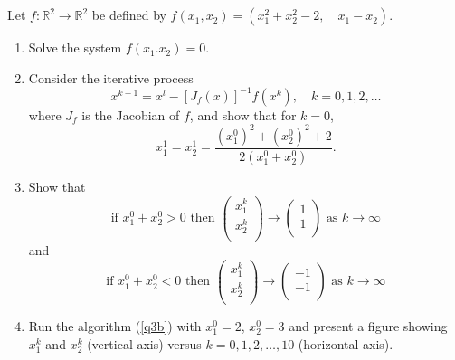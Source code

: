 \documentclass{article}
\begin{document}
\section{}
Let $f:\mathbb{R}^2 \to \mathbb{R}^2$ be defined by $f(x_1,x_2)= (x_1^2 + x_2^2-2, \quad x_1 - x_2)$.
\begin{enumerate}[label = (\alph*)]
    \item Solve the system $f(x_1.x_2)=0$.
    \item Consider the iterative process
    \begin{equation}
        \label{q3b}
        x^{k+1} = x^l - [J_f(x)]^{-1}f(x^k), \quad k=0,1,2,\dots
    \end{equation}
    where $J_f$ is the Jacobian of $f$, and show that for $k=0$,
    \begin{equation*}
        x_1^1 = x_2^1 = \frac{(x_1^0)^2+(x_2^0)^2+2}{2(x_1^0+x_2^0)}.
    \end{equation*}
    \item Show that
    \begin{equation*}
        \text{if } x_1^0 + x_2^0 >0 \text{ then } 
        \begin{pmatrix} x_1^k \\[1ex] x_2^k\\[1ex] \end{pmatrix} \to \begin{pmatrix} 1 \\[1ex] 1\\[1ex] \end{pmatrix} \text{ as } k \to \infty
    \end{equation*}
    and
    \begin{equation*}
        \text{if } x_1^0 + x_2^0 <0 \text{ then } 
        \begin{pmatrix} x_1^k \\[1ex] x_2^k\\[1ex] \end{pmatrix} \to \begin{pmatrix} -1 \\[1ex] -1\\[1ex] \end{pmatrix} \text{ as } k \to \infty
    \end{equation*}
    \item Run the algorithm (\ref{q3b}) with $x_1^0 = 2$, $x_2^0=3$ and present a figure showing $x_1^k$ and $x_2^k$ (vertical axis) versus $k=0,1,2,\dots ,10$ (horizontal axis).
\end{enumerate}
\end{document}
